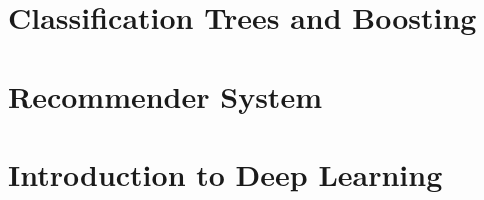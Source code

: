 \documentclass[
]{book}
\begin{document}
\hypertarget{classification-trees-and-boosting}{%
\chapter{Classification Trees and Boosting}\label{classification-trees-and-boosting}}

\hypertarget{recommender-system}{%
\chapter{Recommender System}\label{recommender-system}}

\hypertarget{introduction-to-deep-learning}{%
\chapter{Introduction to Deep Learning}\label{introduction-to-deep-learning}}

  
\end{document}

